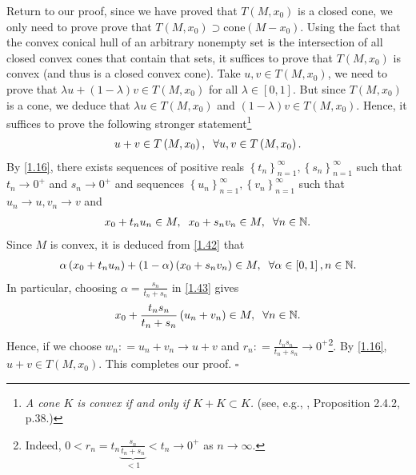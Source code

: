 \documentclass[a4paper]{article}
\numberwithin{equation}{section}
\begin{document}
\begin{enumerate}
Return to our proof, since we have proved that $T\left(M,x_0\right)$ is a closed cone, we only need to prove prove that $T\left( {M,{x_0}} \right) \supset \mbox{cone}\left( {M - {x_0}} \right)$. Using the fact that the convex conical hull of an arbitrary nonempty set is the intersection of all closed convex cones that contain that sets, it suffices to prove that $T\left(M,x_0\right)$ is convex (and thus is a closed convex cone). Take $u,v\in T\left(M,x_0\right)$, we need to prove that $\lambda u + \left( {1 - \lambda } \right)v \in T\left( {M,{x_0}} \right)$ for all $\lambda \in \left[0,1\right]$. But since $T\left(M,x_0\right)$ is a cone, we deduce that $\lambda u \in T\left( {M,{x_0}} \right)$ and $\left( {1 - \lambda } \right)v \in T\left( {M,{x_0}} \right)$. Hence, it suffices to prove the following stronger statement\footnote{\textit{A cone $K$ is convex if and only if $K+K\subset K$.} (see, e.g., \cite{2}, Proposition 2.4.2, p.38.)}
\begin{align}
u + v \in T\left( {M,{x_0}} \right),\hspace{0.2cm} \forall u,v \in T\left( {M,{x_0}} \right).
\end{align}
By \eqref{1.16}, there exists sequences of positive reals $\left\{ {{t_n}} \right\}_{n = 1}^\infty ,\left\{ {{s_n}} \right\}_{n = 1}^\infty $ such that $t_n\to 0^+$ and $s_n\to 0^+$ and sequences $\left\{ {{u_n}} \right\}_{n = 1}^\infty ,\left\{ {{v_n}} \right\}_{n = 1}^\infty $ such that $u_n\to u,v_n\to v$ and
\begin{align}
\label{1.42}
{x_0} + {t_n}{u_n} \in M,\hspace{0.2cm} {x_0} + {s_n}{v_n} \in M ,\hspace{0.2cm} \forall n\in \mathbb{N}.
\end{align}
Since $M$ is convex, it is deduced from \eqref{1.42} that
\begin{align}
\label{1.43}
\alpha \left( {{x_0} + {t_n}{u_n}} \right) + \left( {1 - \alpha } \right)\left( {{x_0} + {s_n}{v_n}} \right) \in M, \hspace{0.2cm} \forall \alpha  \in \left[ {0,1} \right],n\in \mathbb{N}.
\end{align}
In particular, choosing $\alpha  = \frac{{{s_n}}}{{{t_n} + {s_n}}}$ in \eqref{1.43} gives
\begin{align}
{x_0} + \frac{{{t_n}{s_n}}}{{{t_n} + {s_n}}}\left( {{u_n} + {v_n}} \right) \in M, \hspace{0.2cm} \forall n  \in \mathbb{N}.
\end{align}
Hence, if we choose ${w_n}: = {u_n} + {v_n} \to u + v$ and ${r_n}: = \frac{{{t_n}{s_n}}}{{{t_n} + {s_n}}} \to {0^ + }$\footnote{Indeed, $0 < {r_n} = {t_n}\underbrace {\frac{{{s_n}}}{{{t_n} + {s_n}}}}_{ < 1} < {t_n} \to {0^ + }$ as $n\to \infty$.}. By \eqref{1.16}, $u+v \in T\left(M,x_0\right)$. This completes our proof. \hfill $\square$\\

\end{enumerate}
\end{document}
